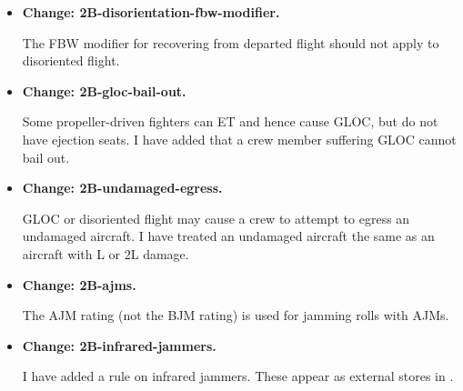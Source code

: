\documentclass[10pt]{report}
\newcommand{\itemtag}[1]{\item \textbf{Change: #1.}\par}
\begin{document}
\begin{itemize}
    \itemtag{2B-disorientation-fbw-modifier} The FBW modifier for recovering from departed flight should not apply to disoriented flight.

    \itemtag{2B-gloc-bail-out} Some propeller-driven fighters can ET and hence cause GLOC, but do not have ejection seats. I have added that a crew member suffering GLOC cannot bail out.

    \itemtag{2B-undamaged-egress} GLOC or disoriented flight may cause a crew to attempt to egress an undamaged aircraft. I have treated an undamaged aircraft the same as an aircraft with L or 2L damage.
    
    \itemtag{2B-ajms} The AJM rating (not the BJM rating) is used for jamming rolls with AJMs.
    
    \itemtag{2B-infrared-jammers} I have added a rule on infrared jammers. These appear as external stores in {\TSOH}.
    
    
    
    
    
    
    

\end{itemize}
\end{document}

